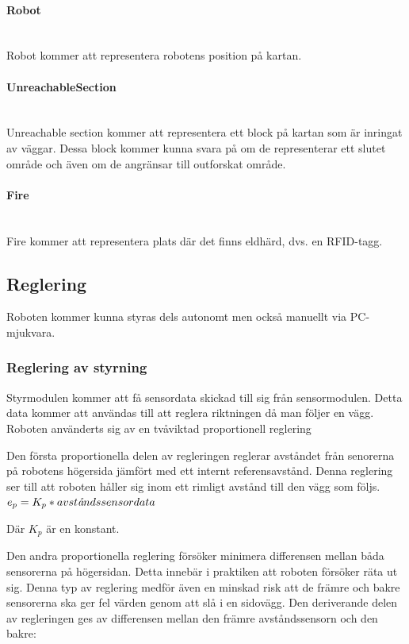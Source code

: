 \documentclass[a4paper,12pt,fleqn]{article}
\begin{document}
\paragraph{Robot} 
~\\
Robot kommer att representera robotens position på kartan. 

\paragraph{UnreachableSection} 
~\\
Unreachable section kommer att representera ett block på kartan som är inringat av väggar. Dessa block kommer kunna svara på om de representerar ett slutet område och även om de angränsar till outforskat område. 

\paragraph{Fire} 
~\\
Fire kommer att representera plats där det finns eldhärd, dvs. en RFID-tagg. 
\newpage

\subsection{Reglering}

Roboten kommer kunna styras dels autonomt men också manuellt via PC-mjukvara. 

\subsubsection{Reglering av styrning}
Styrmodulen kommer att få sensordata skickad till sig från sensormodulen. Detta data kommer att användas till att reglera riktningen då man följer en vägg. Roboten använderts sig av en tvåviktad proportionell reglering 

Den första proportionella delen av regleringen reglerar avståndet från senorerna på robotens högersida jämfört med ett internt referensavstånd. Denna reglering ser till att roboten håller sig inom ett rimligt avstånd till den vägg som följs.
$ e_p = K_{p}*avst\text{\it{å}}ndssensordata $

Där $K_{p}$ är en konstant.

Den andra proportionella reglering försöker minimera differensen mellan båda sensorerna på högersidan. Detta innebär i praktiken att  roboten försöker räta ut sig. Denna typ av reglering medför även en minskad risk att de främre och bakre sensorerna ska ger fel värden genom att slå i en sidovägg.
Den deriverande delen av regleringen ges av differensen mellan den främre avståndssensorn och den bakre: 
\end{document}
